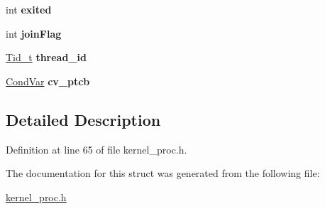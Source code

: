 \begin{DoxyCompactItemize}
\item 
int {\bfseries exited}\hypertarget{structprocess__thread__control__block_a82f3f6173804416baca330d08a0b9a42}{}\label{structprocess__thread__control__block_a82f3f6173804416baca330d08a0b9a42}

\item 
int {\bfseries join\+Flag}\hypertarget{structprocess__thread__control__block_a2621da92c7cf9f63f6fb283d63483a5a}{}\label{structprocess__thread__control__block_a2621da92c7cf9f63f6fb283d63483a5a}

\item 
\hyperlink{group__syscalls_gaf67ad1c55e6b2a79bf8a99106380ce01}{Tid\+\_\+t} {\bfseries thread\+\_\+id}\hypertarget{structprocess__thread__control__block_a0c776905640bee211ddae9a778e5b0df}{}\label{structprocess__thread__control__block_a0c776905640bee211ddae9a778e5b0df}

\item 
\hyperlink{structCondVar}{Cond\+Var} {\bfseries cv\+\_\+ptcb}\hypertarget{structprocess__thread__control__block_a460fe9636de5506fd2aa46348d470650}{}\label{structprocess__thread__control__block_a460fe9636de5506fd2aa46348d470650}

\end{DoxyCompactItemize}


\subsection{Detailed Description}


Definition at line 65 of file kernel\+\_\+proc.\+h.



The documentation for this struct was generated from the following file\+:\begin{DoxyCompactItemize}
\item 
\hyperlink{kernel__proc_8h}{kernel\+\_\+proc.\+h}\end{DoxyCompactItemize}
